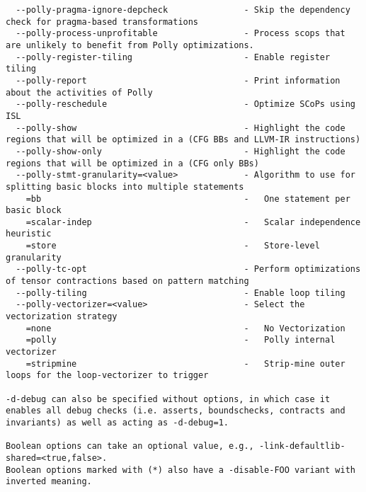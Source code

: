 \documentclass{studrep}
\begin{document}
\begin{verbatim}
  --polly-pragma-ignore-depcheck               - Skip the dependency check for pragma-based transformations
  --polly-process-unprofitable                 - Process scops that are unlikely to benefit from Polly optimizations.
  --polly-register-tiling                      - Enable register tiling
  --polly-report                               - Print information about the activities of Polly
  --polly-reschedule                           - Optimize SCoPs using ISL
  --polly-show                                 - Highlight the code regions that will be optimized in a (CFG BBs and LLVM-IR instructions)
  --polly-show-only                            - Highlight the code regions that will be optimized in a (CFG only BBs)
  --polly-stmt-granularity=<value>             - Algorithm to use for splitting basic blocks into multiple statements
    =bb                                        -   One statement per basic block
    =scalar-indep                              -   Scalar independence heuristic
    =store                                     -   Store-level granularity
  --polly-tc-opt                               - Perform optimizations of tensor contractions based on pattern matching
  --polly-tiling                               - Enable loop tiling
  --polly-vectorizer=<value>                   - Select the vectorization strategy
    =none                                      -   No Vectorization
    =polly                                     -   Polly internal vectorizer
    =stripmine                                 -   Strip-mine outer loops for the loop-vectorizer to trigger

-d-debug can also be specified without options, in which case it enables all debug checks (i.e. asserts, boundschecks, contracts and invariants) as well as acting as -d-debug=1.

Boolean options can take an optional value, e.g., -link-defaultlib-shared=<true,false>.
Boolean options marked with (*) also have a -disable-FOO variant with inverted meaning.
\end{verbatim}
\end{document}
